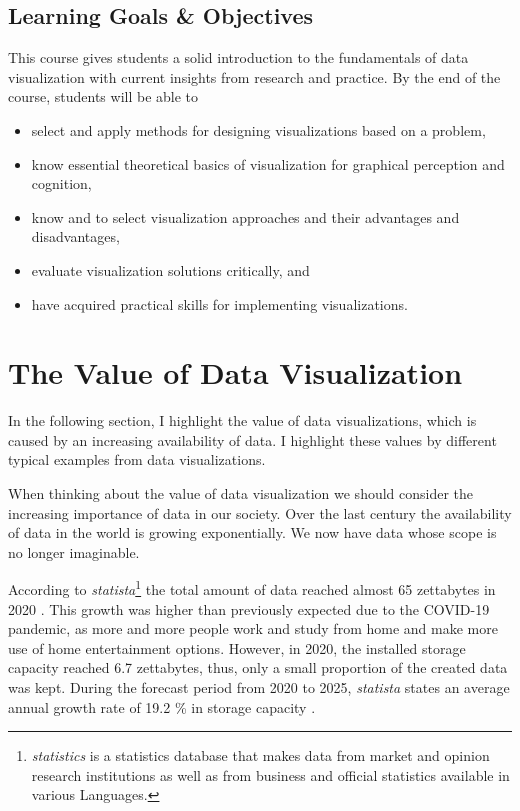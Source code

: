 \documentclass[
]{book}
\providecommand{\tightlist}{%
  \setlength{\itemsep}{0pt}\setlength{\parskip}{0pt}}
\begin{document}
\hypertarget{learning-goals-objectives}{%
\section*{Learning Goals \& Objectives}\label{learning-goals-objectives}}

This course gives students a solid introduction to the fundamentals of data visualization with current insights from research and practice. By the end of the course, students will be able to

\begin{itemize}
\tightlist
\item
  select and apply methods for designing visualizations based on a problem,
\item
  know essential theoretical basics of visualization for graphical perception and cognition,
\item
  know and to select visualization approaches and their advantages and disadvantages,
\item
  evaluate visualization solutions critically, and
\item
  have acquired practical skills for implementing visualizations.
\end{itemize}

\hypertarget{sec:introduction}{%
\chapter{The Value of Data Visualization}\label{sec:introduction}}

In the following section, I highlight the value of data visualizations, which is caused by an increasing availability of data. I highlight these values by different typical examples from data visualizations.

When thinking about the value of data visualization we should consider the increasing importance of data in our society. Over the last century the availability of data in the world is growing exponentially. We now have data whose scope is no longer imaginable.

According to \emph{statista}\footnote{\emph{statistics} is a statistics database that makes data from market and opinion research institutions as well as from business and official statistics available in various Languages.} the total amount of data reached almost 65 zettabytes in 2020 \citep{statista2021}. This growth was higher than previously expected due to the COVID-19 pandemic, as more and more people work and study from home and make more use of home entertainment options. However, in 2020, the installed storage capacity reached 6.7 zettabytes, thus, only a small proportion of the created data was kept. During the forecast period from 2020 to 2025, \emph{statista} states an average annual growth rate of 19.2 \% in storage capacity \citep{statista2021}.
\end{document}
